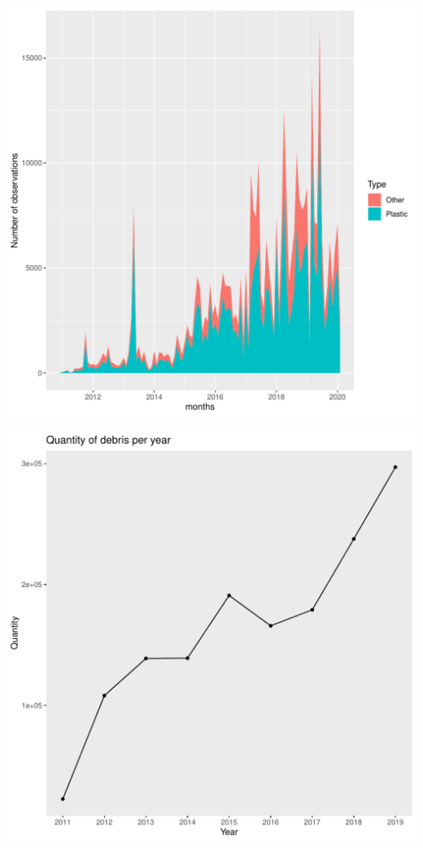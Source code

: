 \documentclass[10pt]{article}\usepackage[]{graphicx}\usepackage[]{color}
\makeatletter
\def\maxwidth{ %
  \ifdim\Gin@nat@width>\linewidth
    \linewidth
  \else
    \Gin@nat@width
  \fi
}
\newenvironment{kframe}{%
 \def\at@end@of@kframe{}%
 \ifinner\ifhmode%
  \def\at@end@of@kframe{\end{minipage}}%
  \begin{minipage}{\columnwidth}%
 \fi\fi%
 \def\FrameCommand##1{\hskip\@totalleftmargin \hskip-\fboxsep
 \colorbox{shadecolor}{##1}\hskip-\fboxsep
     \hskip-\linewidth \hskip-\@totalleftmargin \hskip\columnwidth}%
 \MakeFramed {\advance\hsize-\width
   \@totalleftmargin\z@ \linewidth\hsize
   \@setminipage}}%
 {\par\unskip\endMakeFramed%
 \at@end@of@kframe}
\newenvironment{knitrout}{}{} %
\makeatother
\begin{document}
\begin{itemize}
\begin{knitrout}
\color{fgcolor}
\includegraphics[width=\maxwidth]{figure/unnamed-chunk-21-1} 

\end{knitrout}

\begin{knitrout}
\color{fgcolor}
\includegraphics[width=\maxwidth]{figure/unnamed-chunk-22-1} 
\begin{kframe}


\end{kframe}
\end{knitrout}
\end{itemize}
\end{document}
